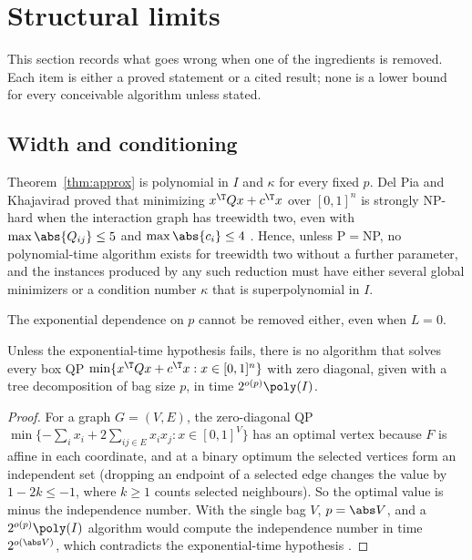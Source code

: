 \section{Structural limits}\label{sec:limits}

This section records what goes wrong when one of the ingredients is
removed. Each item is either a proved statement or a cited result; none is
a lower bound for every conceivable algorithm unless stated.

\subsection{Width and conditioning}
Theorem~\ref{thm:approx} is polynomial in $I$ and $\kappa$ for every fixed
$p$. Del Pia and Khajavirad proved that minimizing $x^\T Qx+c^\T x$ over
$[0,1]^n$ is strongly NP-hard when the interaction graph has treewidth two,
even with $\max\abs{Q_{ij}}\le5$ and $\max\abs{c_i}\le4$
\cite[Theorem~3]{DelPiaKhajavirad2026}. Hence, unless P${}={}$NP, no
polynomial-time algorithm exists for treewidth two without a further
parameter, and the instances produced by any such reduction must have
either several global minimizers or a condition number $\kappa$ that is
superpolynomial in $I$. 

The exponential dependence on $p$ cannot be removed either, even when
$L=0$.

\begin{proposition}\label{prop:eth}
Unless the exponential-time hypothesis fails, there is no algorithm that
solves every box QP $\min\{x^\T Qx+c^\T x:x\in[0,1]^n\}$ with zero diagonal,
given with a tree decomposition of bag size $p$, in time $2^{o(p)}\poly(I)$.
\end{proposition}

\begin{proof}
For a graph $G=(V,E)$, the zero-diagonal QP
$\min\{-\sum_ix_i+2\sum_{ij\in E}x_ix_j:x\in[0,1]^V\}$ has an optimal vertex
because $F$ is affine in each coordinate, and at a binary optimum the
selected vertices form an independent set (dropping an endpoint of a
selected edge changes the value by $1-2k\le-1$, where $k\ge1$ counts selected
neighbours). So the optimal value is minus the independence number. With the
single bag $V$, $p=\abs V$, and a $2^{o(p)}\poly(I)$ algorithm would compute
the independence number in time $2^{o(\abs V)}$, which contradicts the
exponential-time hypothesis \cite{ImpagliazzoPaturiZane2001}.
\end{proof}

